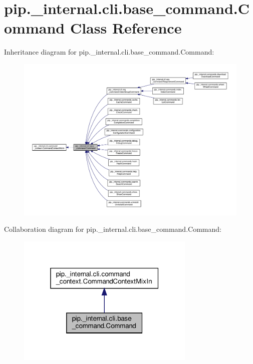 \hypertarget{classpip_1_1__internal_1_1cli_1_1base__command_1_1Command}{}\section{pip.\+\_\+internal.\+cli.\+base\+\_\+command.\+Command Class Reference}
\label{classpip_1_1__internal_1_1cli_1_1base__command_1_1Command}


Inheritance diagram for pip.\+\_\+internal.\+cli.\+base\+\_\+command.\+Command\+:
\nopagebreak
\begin{figure}[H]
\begin{center}
\leavevmode
\includegraphics[width=350pt]{classpip_1_1__internal_1_1cli_1_1base__command_1_1Command__inherit__graph}
\end{center}
\end{figure}


Collaboration diagram for pip.\+\_\+internal.\+cli.\+base\+\_\+command.\+Command\+:
\nopagebreak
\begin{figure}[H]
\begin{center}
\leavevmode
\includegraphics[width=241pt]{classpip_1_1__internal_1_1cli_1_1base__command_1_1Command__coll__graph}
\end{center}
\end{figure}
